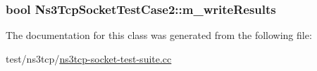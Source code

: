 \subsubsection[{\texorpdfstring{m\+\_\+write\+Results}{m_writeResults}}]{\setlength{\rightskip}{0pt plus 5cm}bool Ns3\+Tcp\+Socket\+Test\+Case2\+::m\+\_\+write\+Results\hspace{0.3cm}{\ttfamily [private]}}\hypertarget{classNs3TcpSocketTestCase2_ad2709b26e5e9099798d28a6f3ec3aef9}{}\label{classNs3TcpSocketTestCase2_ad2709b26e5e9099798d28a6f3ec3aef9}


The documentation for this class was generated from the following file\+:\begin{DoxyCompactItemize}
\item 
test/ns3tcp/\hyperlink{ns3tcp-socket-test-suite_8cc}{ns3tcp-\/socket-\/test-\/suite.\+cc}\end{DoxyCompactItemize}

